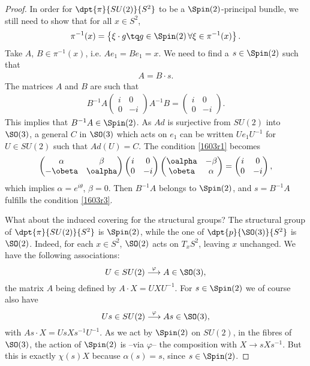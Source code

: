\begin{proof}
In order for $\dpt{\pi}{SU(2)}{S^2}$ to be a $\Spin(2)$-principal bundle, we still need to show that for all $x\in S^2$,
\[
   \pi^{-1}(x)=\left\{\xi\cdot g\tq g\in\Spin(2)\,\forall\xi\in\pi^{-1}(x)\right\}.
\]
Take $A$, $B\in\pi^{-1}(x)$, i.e. $Ae_1=Be_1=x$. We need to find a $s\in\Spin(2)$ such that
\begin{eqnarray}
 \label{1603r3} A=B\cdot s.
\end{eqnarray}
The matrices $A$ and $B$ are such that
\begin{eqnarray}\label{1603r1}
 B^{-1} A\begin{pmatrix}
 i&0\\
 0&-i
         \end{pmatrix}A^{-1} B=\begin{pmatrix}
 i&0\\
 0&-i
         \end{pmatrix}.
\end{eqnarray}
This implies that $B^{-1} A\in\Spin(2)$. As $Ad$ is surjective from $SU(2)$ into $\SO(3)$, a general $C$ in $\SO(3)$ which acts on $e_1$ can be written $Ue_1U^{-1}$ for $U\in SU(2)$ such that $Ad(U)=C$. The condition \eqref{1603r1} becomes
\[
\begin{pmatrix}
\alpha&\beta\\
-\obeta&\oalpha
\end{pmatrix}
\begin{pmatrix}
i&0\\
0&-i
\end{pmatrix}
\begin{pmatrix}
\oalpha&-\beta\\
\obeta&\alpha
\end{pmatrix}=
\begin{pmatrix}
i&0\\
0&-i
\end{pmatrix},
\]
which implies $\alpha=e^{i\theta}$, $\beta=0$. Then $B^{-1} A$ belongs to $\Spin(2)$, and $s=B^{-1} A$ fulfills the condition \eqref{1603r3}.

What about the induced covering for the structural groups? The structural group of $\dpt{\pi}{SU(2)}{S^2}$ is $\Spin(2)$, while the one of $\dpt{p}{\SO(3)}{S^2}$ is $\SO(2)$. Indeed, for each $x\in S^2$, $\SO(2)$ acts on $T_xS^2$, leaving $x$ unchanged. We have the following associations:
\[
         U\in SU(2)\stackrel{\varphi}{\longrightarrow}A\in \SO(3),
\]
the matrix $A$ being defined by $A\cdot X=UXU^{-1}$. For $s\in\Spin(2)$ we of course also have
\[
         Us\in SU(2)\stackrel{\varphi}{\longrightarrow}As\in \SO(3),
\]
with $As\cdot X=UsXs^{-1} U^{-1}$. As we act by $\Spin(2)$ on $SU(2)$, in the fibres of $\SO(3)$, the action of $\Spin(2)$ is --via $\varphi$-- the composition with $X\to sXs^{-1}$. But this is exactly $\chi(s)X$ because $\alpha(s)=s$, since $s\in\Spin(2)$.
\end{proof}

